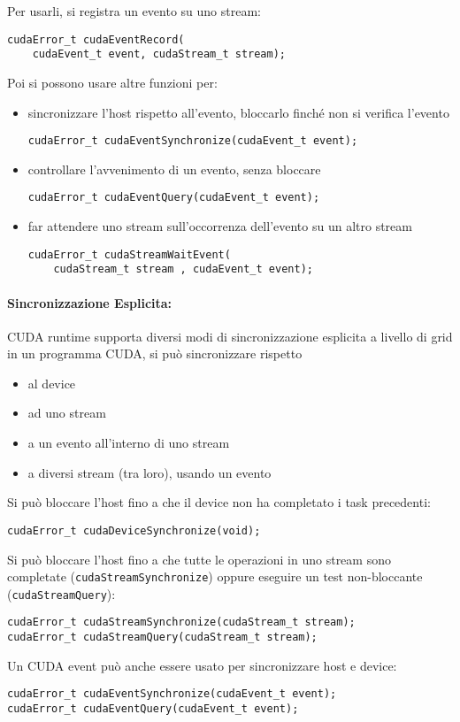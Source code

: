 Per usarli, si registra un evento su uno stream:
\begin{verbatim}
cudaError_t cudaEventRecord(
	cudaEvent_t event, cudaStream_t stream);
\end{verbatim}

Poi si possono usare altre funzioni per:
\begin{itemize}
	\item sincronizzare l'host rispetto all'evento, bloccarlo finché non si verifica l'evento
	\begin{verbatim}
cudaError_t cudaEventSynchronize(cudaEvent_t event);
	\end{verbatim}
	
	\item controllare l'avvenimento di un evento, senza bloccare
	\begin{verbatim}
cudaError_t cudaEventQuery(cudaEvent_t event);
	\end{verbatim}
	
	\item far attendere uno stream sull'occorrenza dell'evento su un altro stream
	\begin{verbatim}
cudaError_t cudaStreamWaitEvent(
	cudaStream_t stream , cudaEvent_t event);
	\end{verbatim}
\end{itemize}

\paragraph{Sincronizzazione Esplicita:} CUDA runtime supporta diversi modi di sincronizzazione esplicita a livello di grid in un programma CUDA, si può sincronizzare rispetto
\begin{itemize}
	\item al device
	
	\item ad uno stream
	
	\item a un evento all'interno di uno stream
	
	\item a diversi stream (tra loro), usando un evento
\end{itemize}

Si può bloccare l'host fino a che il device non ha completato i task precedenti:
\begin{verbatim}
cudaError_t cudaDeviceSynchronize(void);
\end{verbatim}

Si può bloccare l'host fino a che tutte le operazioni in uno stream sono completate (\texttt{cudaStreamSynchronize}) oppure eseguire un test non-bloccante (\texttt{cudaStreamQuery}):
\begin{verbatim}
cudaError_t cudaStreamSynchronize(cudaStream_t stream);
cudaError_t cudaStreamQuery(cudaStream_t stream);
\end{verbatim}

Un CUDA event può anche essere usato per sincronizzare host e device:
\begin{verbatim}
cudaError_t cudaEventSynchronize(cudaEvent_t event);
cudaError_t cudaEventQuery(cudaEvent_t event);
\end{verbatim}

